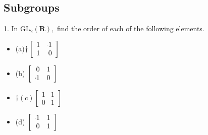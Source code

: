 \subsection{Subgroups}
\begin{mdframed}[style=darkQuesion]
  1. In $\mathrm{GL}_{2}(\mathbf{R}),$ find the order of each of the following elements.
  \begin{multicols}{4}
    \begin{itemize}
      \item[]{ 
                  (a)$\dagger\left[\begin{array}{rr}1 & \m 1 \\ 
                  1 & 0\end{array}\right]$}
      \item[]{ 
                  (b) $\left[\begin{array}{rr}0 & 1 \\ 
                  \m 1 & 0\end{array}\right]$}
      \item[]{ 
                  $\dagger(\mathrm{c})\left[\begin{array}{ll}1 & 1 \\ 
                  0 & 1\end{array}\right]$}
      \item[]{ 
                  (d) $\left[\begin{array}{rr}\m 1 & 1 \\ 
                  0 & 1\end{array}\right]$}
    \end{itemize}
  \end{multicols}
  \vspace{.5cm}
\end{mdframed}

